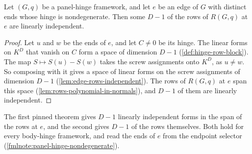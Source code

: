 \begin{lemma}
  \label{lem:case-II-placement-new-rows}
  \leanok
  Let $(G,q)$ be a panel-hinge framework, and let $e$ be an edge of $G$
  with distinct ends whose hinge is nondegenerate. Then some $D - 1$ of
  the rows of $R(G,q)$ at $e$ are linearly independent.
\end{lemma}
\begin{proof}
  \leanok
  Let $u$ and $w$ be the ends of $e$, and let $C \neq 0$ be its hinge.
  The linear forms on $K^D$ that vanish on $C$ form a space of dimension
  $D - 1$ (\cref{def:hinge-row-block}). The map $S \mapsto S(u) - S(w)$
  takes the screw assignments onto $K^D$, as $u \neq w$. So composing
  with it gives a space of linear forms on the screw assignments of
  dimension $D - 1$ (\cref{lem:edge-rows-independent}). The rows of
  $R(G,q)$ at $e$ span this space (\cref{lem:rows-polynomial-in-normals}),
  and $D - 1$ of them are linearly independent.
\end{proof}

\begin{fmlnote}
  The first pinned theorem gives $D - 1$ linearly independent forms in
  the span of the rows at $e$, and the second gives $D - 1$ of the rows
  themselves. Both hold for every body-hinge framework, and read the ends
  of $e$ from the endpoint selector
  (\cref{fmlnote:panel-hinge-nondegenerate}).
\end{fmlnote}

